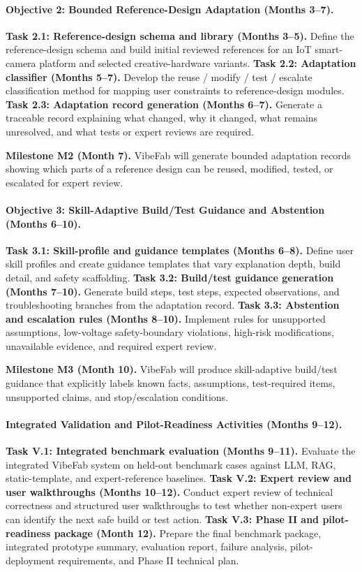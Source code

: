 \vspace{-10pt}
\paragraph{Objective 2: Bounded Reference-Design Adaptation (Months 3--7).}
\textbf{Task 2.1: Reference-design schema and library (Months 3--5).}
Define the reference-design schema and build initial reviewed references for an IoT smart-camera platform and selected creative-hardware variants.
\textbf{Task 2.2: Adaptation classifier (Months 5--7).}
Develop the reuse / modify / test / escalate classification method for mapping user constraints to reference-design modules.
\textbf{Task 2.3: Adaptation record generation (Months 6--7).}
Generate a traceable record explaining what changed, why it changed, what remains unresolved, and what tests or expert reviews are required.

\textbf{Milestone M2 (Month 7).}
VibeFab will generate bounded adaptation records showing which parts of a reference design can be reused, modified, tested, or escalated for expert review.

\vspace{-10pt}
\paragraph{Objective 3: Skill-Adaptive Build/Test Guidance and Abstention (Months 6--10).}
\textbf{Task 3.1: Skill-profile and guidance templates (Months 6--8).}
Define user skill profiles and create guidance templates that vary explanation depth, build detail, and safety scaffolding.
\textbf{Task 3.2: Build/test guidance generation (Months 7--10).}
Generate build steps, test steps, expected observations, and troubleshooting branches from the adaptation record.
\textbf{Task 3.3: Abstention and escalation rules (Months 8--10).}
Implement rules for unsupported assumptions, low-voltage safety-boundary violations, high-risk modifications, unavailable evidence, and required expert review.

\textbf{Milestone M3 (Month 10).}
VibeFab will produce skill-adaptive build/test guidance that explicitly labels known facts, assumptions, test-required items, unsupported claims, and stop/escalation conditions.

\vspace{-10pt}
\paragraph{Integrated Validation and Pilot-Readiness Activities (Months 9--12).}
\textbf{Task V.1: Integrated benchmark evaluation (Months 9--11).}
Evaluate the integrated VibeFab system on held-out benchmark cases against LLM, RAG, static-template, and expert-reference baselines.
\textbf{Task V.2: Expert review and user walkthroughs (Months 10--12).}
Conduct expert review of technical correctness and structured user walkthroughs to test whether non-expert users can identify the next safe build or test action.
\textbf{Task V.3: Phase II and pilot-readiness package (Month 12).}
Prepare the final benchmark package, integrated prototype summary, evaluation report, failure analysis, pilot-deployment requirements, and Phase II technical plan.

